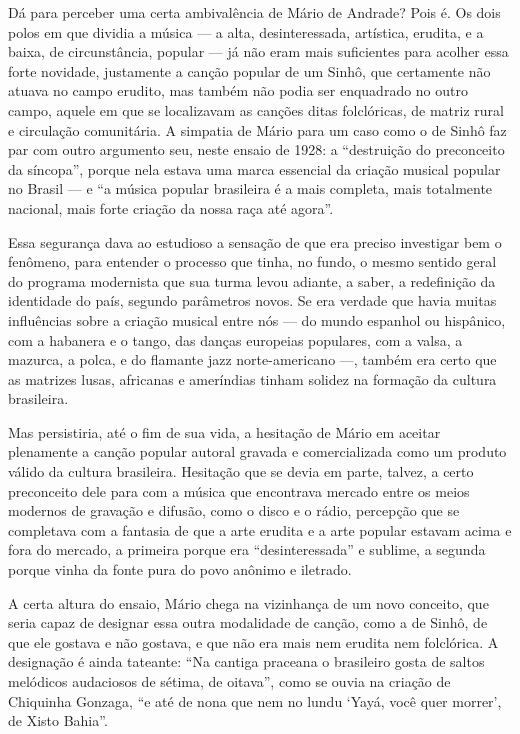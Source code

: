 Dá para perceber uma certa ambivalência de Mário de Andrade? Pois é. Os
dois polos em que dividia a música --- a alta, desinteressada, artística,
erudita, e a baixa, de circunstância, popular --- já não eram mais
suficientes para acolher essa forte novidade, justamente a canção
popular de um Sinhô, que certamente não atuava no campo erudito, mas
também não podia ser enquadrado no outro campo, aquele em que se
localizavam as canções ditas folclóricas, de matriz rural e circulação
comunitária. A simpatia de Mário para um caso como o de Sinhô faz par
com outro argumento seu, neste ensaio de 1928: a ``destruição do
preconceito da síncopa'', porque nela estava uma marca essencial da
criação musical popular no Brasil --- e ``a música popular brasileira é a
mais completa, mais totalmente nacional, mais forte criação da nossa
raça até agora''.

Essa segurança dava ao estudioso a sensação de que era preciso
investigar bem o fenômeno, para entender o processo que tinha, no fundo,
o mesmo sentido geral do programa modernista que sua turma levou
adiante, a saber, a redefinição da identidade do país, segundo
parâmetros novos. Se era verdade que havia muitas influências sobre a
criação musical entre nós --- do mundo espanhol ou hispânico, com a
habanera e o tango, das danças europeias populares, com a valsa, a
mazurca, a polca, e do flamante jazz norte-americano ---, também era
certo que as matrizes lusas, africanas e ameríndias tinham solidez na
formação da cultura brasileira.

Mas persistiria, até o fim de sua vida, a hesitação de Mário em aceitar
plenamente a canção popular autoral gravada e comercializada como um
produto válido da cultura brasileira. Hesitação que se devia em parte,
talvez, a certo preconceito dele para com a música que encontrava
mercado entre os meios modernos de gravação e difusão, como o disco e o
rádio, percepção que se completava com a fantasia de que a arte erudita
e a arte popular estavam acima e fora do mercado, a primeira porque era
``desinteressada'' e sublime, a segunda porque vinha da fonte pura do
povo anônimo e iletrado.

A certa altura do ensaio, Mário chega na vizinhança de um novo conceito,
que seria capaz de designar essa outra modalidade de canção, como a de
Sinhô, de que ele gostava e não gostava, e que não era mais nem erudita
nem folclórica. A designação é ainda tateante: ``Na cantiga praceana o
brasileiro gosta de saltos melódicos audaciosos de sétima, de oitava'',
como se ouvia na criação de Chiquinha Gonzaga, ``e até de nona que nem
no lundu `Yayá, você quer morrer', de Xisto Bahia''.

